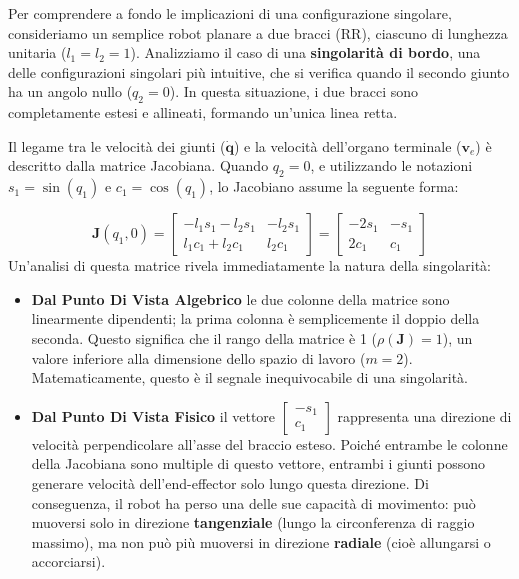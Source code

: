 ﻿\documentclass[11pt, a4paper]{article}
\begin{document}
\hfill
\begin{minipage}[c]{0.48\textwidth}
Per comprendere a fondo le implicazioni di una configurazione singolare, consideriamo un semplice robot planare a due bracci (RR), ciascuno di lunghezza unitaria ($l_1 = l_2 = 1$). Analizziamo il caso di una \textbf{singolarità di bordo}, una delle configurazioni singolari più intuitive, che si verifica quando il secondo giunto ha un angolo nullo ($q_2 = 0$). In questa situazione, i due bracci sono completamente estesi e allineati, formando un'unica linea retta.

Il legame tra le velocità dei giunti ($\dot{\bm{q}}$) e la velocità dell'organo terminale ($\bm{v}_e$) è descritto dalla matrice Jacobiana. Quando $q_2 = 0$, e utilizzando le notazioni $s_1 = \sin(q_1)$ e $c_1 = \cos(q_1)$, lo Jacobiano assume la seguente forma:
\end{minipage}
\[
    \bm{J}(q_1, 0) = \begin{bmatrix} -l_1s_1 - l_2s_1 & -l_2s_1 \\ l_1c_1 + l_2c_1 & l_2c_1 \end{bmatrix} = \begin{bmatrix} -2s_1 & -s_1 \\ 2c_1 & c_1 \end{bmatrix}
\]
Un'analisi di questa matrice rivela immediatamente la natura della singolarità:
\begin{itemize}
    \item \textbf{Dal Punto Di Vista Algebrico} le due colonne della matrice sono linearmente dipendenti; la prima colonna è semplicemente il doppio della seconda. Questo significa che il rango della matrice è 1 ($\rho(\bm{J})=1$), un valore inferiore alla dimensione dello spazio di lavoro ($m=2$). Matematicamente, questo è il segnale inequivocabile di una singolarità.

    \item \textbf{Dal Punto Di Vista Fisico} il vettore $\begin{bmatrix}-s_1 \\ c_1\end{bmatrix}$ rappresenta una direzione di velocità perpendicolare all'asse del braccio esteso. Poiché entrambe le colonne della Jacobiana sono multiple di questo vettore, entrambi i giunti possono generare velocità dell'end-effector solo lungo questa direzione. Di conseguenza, il robot ha perso una delle sue capacità di movimento: può muoversi solo in direzione \textbf{tangenziale} (lungo la circonferenza di raggio massimo), ma non può più muoversi in direzione \textbf{radiale} (cioè allungarsi o accorciarsi).
\end{itemize}
\end{document}
